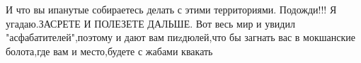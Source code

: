  
 
 
 
 


И что вы ипанутые собираетесь делать с этими территориями. Подожди!!! Я
угадаю.ЗАСРЕТЕ И ПОЛЕЗЕТЕ ДАЛЬШЕ. Вот весь мир и увидил "асфабатителей",поэтому
и дают вам пиzдюлей,что бы загнать вас в мокшанские болота,где вам и
место,будете с жабами квакать
